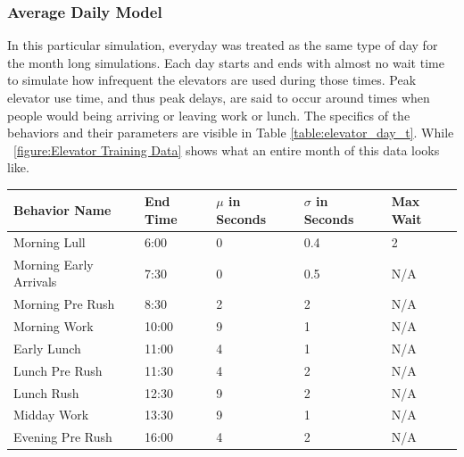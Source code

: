   \subsubsection{ Average Daily Model}
  In this particular simulation, everyday was treated as the same type of day
  for the month long simulations. Each day starts and ends with almost no wait
  time to simulate how infrequent the elevators are used during those times.
  Peak elevator use time, and thus peak delays, are said to occur around times
  when people would being arriving or leaving work or lunch. The specifics of
  the behaviors and their parameters are visible in Table
  \ref{table:elevator_day_t}. While ~\ref{figure:Elevator Training Data} shows
  what an entire month of this data looks like.

  \begin{table}[!htb]
    \begin{tabular}{|l|l|l|l|l|}
      \hline
      Behavior Name          & End Time & $\mu$ in Seconds & $\sigma$ in Seconds & Max Wait \\ \hline
      Morning Lull           & 6:00     & 0                                 & 0.4                           & 2        \\ \hline
      Morning Early Arrivals & 7:30     & 0                                 & 0.5                           & N/A      \\ \hline
      Morning Pre Rush       & 8:30     & 2                                 & 2                             & N/A      \\ \hline
      Morning Work           & 10:00    & 9                                 & 1                             & N/A      \\ \hline
      Early Lunch            & 11:00    & 4                                 & 1                             & N/A      \\ \hline
      Lunch Pre Rush         & 11:30    & 4                                 & 2                             & N/A      \\ \hline
      Lunch Rush             & 12:30    & 9                                 & 2                             & N/A      \\ \hline
      Midday Work            & 13:30    & 9                                 & 1                             & N/A      \\ \hline
      Evening Pre Rush       & 16:00    & 4                                 & 2                             & N/A      \\ \hline

\end{tabular}
\end{table}
